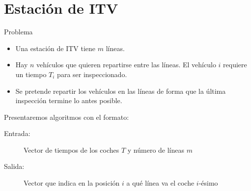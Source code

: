 \section{Estación de ITV}

\begin{frame}{Problema}
\begin{itemize}
	\item Una estación de ITV tiene $m$ líneas.
	\pause
	\item Hay $n$ vehículos que quieren repartirse entre las líneas. El vehículo $i$
	requiere un tiempo $T_i$ para ser inspeccionado.
	\pause
	\item Se pretende repartir los vehículos en las líneas de forma que la última
	inspección termine lo antes posible.
\end{itemize}
\pause

Presentaremos algoritmos con el formato:
\begin{description}
 \item[Entrada:] Vector de tiempos de los coches $T$ y número de líneas $m$
 \item[Salida:] Vector que indica en la posición $i$ a qué línea va el coche $i$-ésimo
\end{description}
\end{frame}

